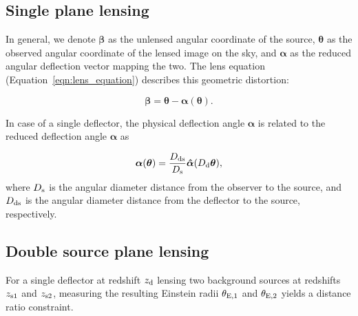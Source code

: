 \documentclass[a4paper,11pt]{article}
\begin{document}
\subsection{Single plane lensing}
In general, we denote $\boldsymbol{\beta}$ as the unlensed angular coordinate of the source, $\boldsymbol{\theta}$ as the observed angular coordinate of the lensed image on the sky, and $\boldsymbol{\alpha}$ as the reduced angular deflection vector mapping the two. The lens equation (Equation~\ref{eqn:lens_equation}) describes this geometric distortion:

\begin{equation}\label{eqn:lens_equation}
    \boldsymbol{\beta} = \boldsymbol{\theta} - \boldsymbol{\alpha}(\boldsymbol{\theta}).
\end{equation}

In case of a single deflector, the physical deflection angle $\hat{\boldsymbol{\alpha}}$ is related to the reduced deflection angle $\boldsymbol{\alpha}$ as

\begin{equation} \label{eqn:physical_reduced_deflection}
    \boldsymbol{\alpha}(\boldsymbol{\theta}) = \frac{D_{\rm ds}}{D_{\rm s}} \boldsymbol{\hat{\alpha}}(D_{\rm d}\boldsymbol{\theta}),
\end{equation}
where $D_{\rm s}$ is the angular diameter distance from the observer to the source, and $D_{\rm ds}$ is the angular diameter distance from the deflector to the source, respectively.



\subsection{Double source plane lensing}
For a single deflector at redshift $z_{\rm d}$ lensing two background sources at redshifts $z_{\rm s1}$ and $z_{\rm s2}$, measuring the resulting Einstein radii $\theta_{\rm E, 1}$ and $\theta_{\rm E, 2}$ yields a distance ratio constraint.
\end{document}
